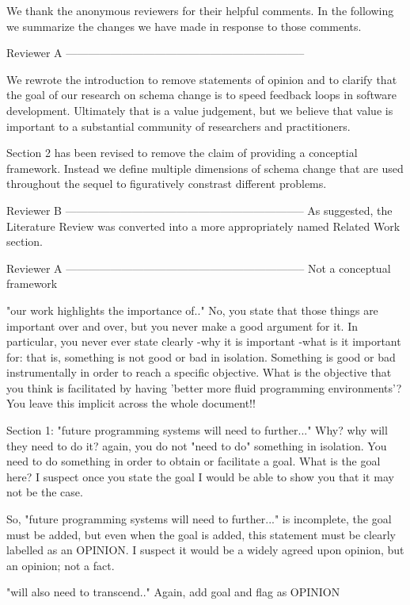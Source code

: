 We thank the anonymous reviewers for their helpful comments. In the following we summarize the changes we have made in response to those comments.

Reviewer A
-----------------------------------------------------------------


We rewrote the introduction to remove statements of opinion and to clarify that the goal of our research on schema change is to speed feedback loops in software development. Ultimately that is a value judgement, but we believe that value is important to a substantial community of researchers and practitioners.

Section 2 has been revised to remove the claim of providing a conceptial framework. Instead we define multiple dimensions of schema change that are used throughout the sequel to figuratively constrast different problems.


Reviewer B
-----------------------------------------------------------------
As suggested, the Literature Review was converted into a more appropriately named Related Work section.




Reviewer A
-----------------------------------------------------------------
Not a conceptual framework

"our work highlights the importance of.." No, you state that those things are important over and over, but you never make a good argument for it. In particular, you never ever state clearly -why it is important -what is it important for: that is, something is not good or bad in isolation. Something is good or bad instrumentally in order to reach a specific objective. What is the objective that you think is facilitated by having 'better more fluid programming environments'? You leave this implicit across the whole document!!

Section 1: "future programming systems will need to further..." Why? why will they need to do it? again, you do not "need to do" something in isolation. You need to do something in order to obtain or facilitate a goal. What is the goal here? I suspect once you state the goal I would be able to show you that it may not be the case.

So, "future programming systems will need to further..." is incomplete, the goal must be added, but even when the goal is added, this statement must be clearly labelled as an OPINION. I suspect it would be a widely agreed upon opinion, but an opinion; not a fact.

"will also need to transcend.." Again, add goal and flag as OPINION

